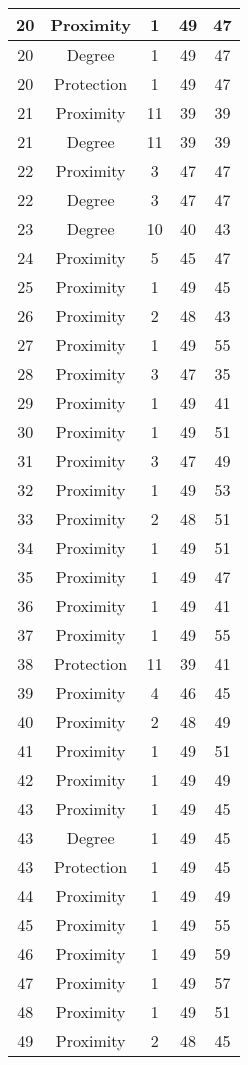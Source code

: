 \documentclass[results.tex]{subfiles}
\begin{document}
\begin{center}
\begin{tabular}{| c || c | c | c | c |}
    \hline
    20 & Proximity & 1 & 49 & 47 \\ 
    \hline
    20 & Degree & 1 & 49 & 47 \\ 
    \hline
    20 & Protection & 1 & 49 & 47 \\ 
    \hline
    21 & Proximity & 11 & 39 & 39 \\ 
    \hline
    21 & Degree & 11 & 39 & 39 \\ 
    \hline
    22 & Proximity & 3 & 47 & 47 \\ 
    \hline
    22 & Degree & 3 & 47 & 47 \\ 
    \hline
    23 & Degree & 10 & 40 & 43 \\ 
    \hline
    24 & Proximity & 5 & 45 & 47 \\ 
    \hline
    25 & Proximity & 1 & 49 & 45 \\ 
    \hline
    26 & Proximity & 2 & 48 & 43 \\ 
    \hline
    27 & Proximity & 1 & 49 & 55 \\ 
    \hline
    28 & Proximity & 3 & 47 & 35 \\ 
    \hline
    29 & Proximity & 1 & 49 & 41 \\ 
    \hline
    30 & Proximity & 1 & 49 & 51 \\ 
    \hline
    31 & Proximity & 3 & 47 & 49 \\ 
    \hline
    32 & Proximity & 1 & 49 & 53 \\ 
    \hline
    33 & Proximity & 2 & 48 & 51 \\ 
    \hline
    34 & Proximity & 1 & 49 & 51 \\ 
    \hline
    35 & Proximity & 1 & 49 & 47 \\ 
    \hline
    36 & Proximity & 1 & 49 & 41 \\ 
    \hline
    37 & Proximity & 1 & 49 & 55 \\ 
    \hline
    38 & Protection & 11 & 39 & 41 \\ 
    \hline
    39 & Proximity & 4 & 46 & 45 \\ 
    \hline
    40 & Proximity & 2 & 48 & 49 \\ 
    \hline
    41 & Proximity & 1 & 49 & 51 \\ 
    \hline
    42 & Proximity & 1 & 49 & 49 \\ 
    \hline
    43 & Proximity & 1 & 49 & 45 \\ 
    \hline
    43 & Degree & 1 & 49 & 45 \\ 
    \hline
    43 & Protection & 1 & 49 & 45 \\ 
    \hline
    44 & Proximity & 1 & 49 & 49 \\ 
    \hline
    45 & Proximity & 1 & 49 & 55 \\ 
    \hline
    46 & Proximity & 1 & 49 & 59 \\ 
    \hline
    47 & Proximity & 1 & 49 & 57 \\ 
    \hline
    48 & Proximity & 1 & 49 & 51 \\ 
    \hline
    49 & Proximity & 2 & 48 & 45 \\ 
    \hline   \end{tabular}
\end{center}
\end{document}
